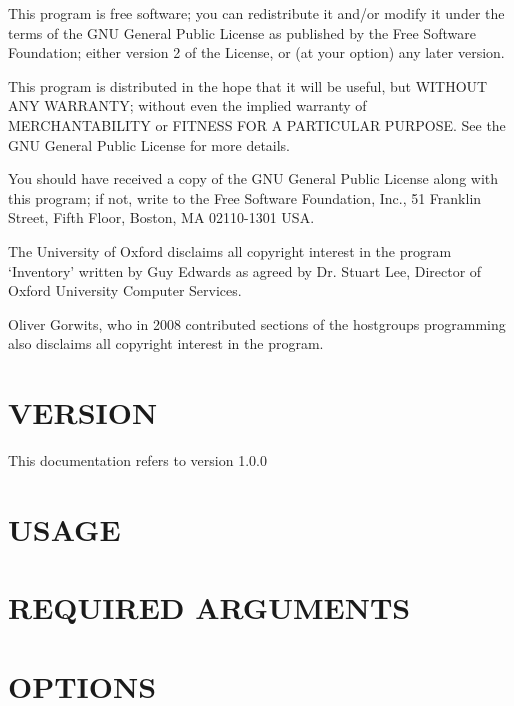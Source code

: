 \documentclass{book}
\begin{document}
This program is free software; you can redistribute it and/or modify it under the terms of the GNU General Public License as published by the Free Software Foundation; either version 2 of the License, or (at your option) any later version.



This program is distributed in the hope that it will be useful, but WITHOUT ANY WARRANTY; without even the implied warranty of MERCHANTABILITY or FITNESS FOR A PARTICULAR PURPOSE. See the GNU General Public License for more details.



You should have received a copy of the GNU General Public License along with this program; if not, write to the Free Software Foundation, Inc., 51 Franklin Street, Fifth Floor, Boston, MA 02110-1301 USA.



The University of Oxford disclaims all copyright interest in the program `Inventory' written by Guy Edwards as agreed by Dr. Stuart Lee, Director of Oxford University Computer Services.



Oliver Gorwits, who in 2008 contributed sections of the hostgroups programming also disclaims all copyright interest in the program.




\section{VERSION}
\label{_VERSION}
\hypertarget{_VERSION}{}



This documentation refers to version 1.0.0


\section{USAGE}
\label{_USAGE}
\hypertarget{_USAGE}{}


\section{REQUIRED ARGUMENTS}
\label{_REQUIRED_ARGUMENTS}
\hypertarget{_REQUIRED_ARGUMENTS}{}


\section{OPTIONS}
\label{_OPTIONS}
\hypertarget{_OPTIONS}{}
\end{document}
